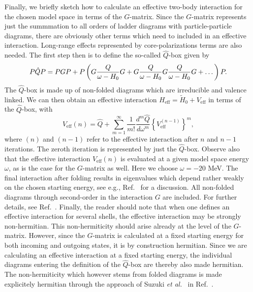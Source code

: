 Finally, we briefly sketch how to calculate an effective 
two-body interaction for the chosen model space
in terms of the $G$-matrix.  Since the $G$-matrix represents just
the summmation to all orders of ladder diagrams with particle-particle
diagrams, there are obviously other terms which need to included
in an effective interaction. Long-range effects represented by 
core-polarizations terms are also needed.
The first step then is to define the so-called $\hat{Q}$-box given by
\begin{equation}
   P\hat{Q}P=PGP+
   P\left(G\frac{Q}{\omega-H_{0}}G\\ +G
   \frac{Q}{\omega-H_{0}}G \frac{Q}{\omega-H_{0}}G +\dots\right)P.
   \label{eq:qbox}
\end{equation}
The $\hat{Q}$-box is made up of non-folded diagrams which are irreducible
and valence linked.
We can then obtain an effective interaction
$H_{\mathrm{eff}}=\tilde{H}_0+V_{\mathrm{eff}}$ in 
terms of the $\hat{Q}$-box,
with \cite{hko95}
\begin{equation}
    V_{\mathrm{eff}}(n)=\hat{Q}+{\displaystyle\sum_{m=1}^{\infty}}
    \frac{1}{m!}\frac{d^m\hat{Q}}{d\omega^m}\left\{
    V_{\mathrm{eff}}^{(n-1)}\right\}^m,
    \label{eq:fd}
\end{equation}
where $(n)$ and $(n-1)$ refer to the effective interaction after
$n$ and $n-1$ iterations. The zeroth iteration is represented by just the 
$\hat{Q}$-box.
Observe also that the
effective interaction $V_{\mathrm{eff}}(n)$
is evaluated at a given model space energy
$\omega$, as is the case for the $G$-matrix as well. Here we choose
$\omega =-20$ MeV. The final interaction after folding
results in eigenvalues which depend rather weakly on the 
chosen starting energy, see e.g., Ref.\ \cite{converge93}
for a discussion.
All non-folded diagrams through 
second-order in the interaction $G$ are included.
For further details, see Ref.\ \cite{hko95}.
Finally, the reader should note that when one defines an
effective interaction for several shells, the effective
interaction may be strongly non-hermitian. 
This non-hermiticity should arise already at the level
of the $G$-matrix. However, since the $G$-matrix
is calculated at a fixed starting energy
for both incoming and outgoing states, it is by construction
hermitian. Since we are calculating an effective interaction at a
fixed starting energy, the individual diagrams
entering the definition of the $\hat{Q}$-box 
are thereby also made hermitian. The non-hermiticity 
which however stems from folded diagrams
is made explicitely hermitian through the 
approach of Suzuki {\em et al.\ } 
in Ref.\ \cite{kenji}.


